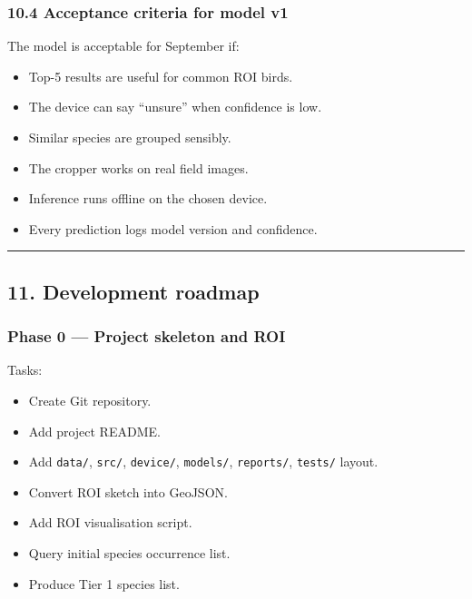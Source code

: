 \documentclass[
  11pt,
]{article}
\providecommand{\tightlist}{%
  \setlength{\itemsep}{0pt}\setlength{\parskip}{0pt}}
\begin{document}
\subsubsection{10.4 Acceptance criteria for model
v1}\label{acceptance-criteria-for-model-v1}

The model is acceptable for September if:

\begin{itemize}
\tightlist
\item
  Top-5 results are useful for common ROI birds.
\item
  The device can say ``unsure'' when confidence is low.
\item
  Similar species are grouped sensibly.
\item
  The cropper works on real field images.
\item
  Inference runs offline on the chosen device.
\item
  Every prediction logs model version and confidence.
\end{itemize}

\begin{center}\rule{0.5\linewidth}{0.5pt}\end{center}

\subsection{11. Development roadmap}\label{development-roadmap}

\subsubsection{Phase 0 --- Project skeleton and
ROI}\label{phase-0-project-skeleton-and-roi}

Tasks:

\begin{itemize}
\tightlist
\item[$\square$]
  Create Git repository.
\item[$\square$]
  Add project README.
\item[$\square$]
  Add \texttt{data/}, \texttt{src/}, \texttt{device/}, \texttt{models/},
  \texttt{reports/}, \texttt{tests/} layout.
\item[$\square$]
  Convert ROI sketch into GeoJSON.
\item[$\square$]
  Add ROI visualisation script.
\item[$\square$]
  Query initial species occurrence list.
\item[$\square$]
  Produce Tier 1 species list.
\end{itemize}
\end{document}
